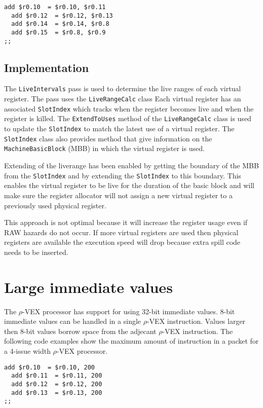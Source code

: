 \begin{lstlisting}[language=rvex]
  add $r0.10  = $r0.10, $r0.11
  add $r0.12  = $r0.12, $r0.13
  add $r0.14  = $r0.14, $r0.8
  add $r0.15  = $r0.8, $r0.9
;;
\end{lstlisting}

\subsection{Implementation} %
\label{sub:implementation}
The \texttt{LiveIntervals} pass is used to determine the live ranges of each virtual register. The pass uses the \texttt{LiveRangeCalc} class
Each virtual register has an associated \texttt{SlotIndex} which tracks when the register becomes live and when the register is killed. The \texttt{ExtendToUses} method of the \texttt{LiveRangeCalc} class is used to update the \texttt{SlotIndex} to match the latest use of a virtual register. The \texttt{SlotIndex} class also provides method that give information on the \texttt{MachineBasicBlock} (MBB) in which the virtual register is used.

Extending of the liverange has been enabled by getting the boundary of the MBB from the \texttt{SlotIndex} and by extending the \texttt{SlotIndex} to this boundary. This enables the virtual register to be live for the duration of the basic block and will make sure the register allocator will not assign a new virtual register to a previously used physical register.

This approach is not optimal because it will increase the register usage even if RAW hazards do not occur. If more virtual registers are used then physical registers are available the execution speed will drop because extra spill code needs to be inserted.

\section{Large immediate values}
The $\rho$-VEX processor has support for using 32-bit immediate values. 8-bit immediate values can be handled in a single $\rho$-VEX instruction. Values larger then 8-bit values borrow space from the adjecant $\rho$-VEX instruction. The following code examples show the maximum amount of instruction in a packet for a 4-issue width $\rho$-VEX processor.

\begin{lstlisting}[language=rvex]
  add $r0.10  = $r0.10, 200
  add $r0.11  = $r0.11, 200
  add $r0.12  = $r0.12, 200
  add $r0.13  = $r0.13, 200
;;
\end{lstlisting}

